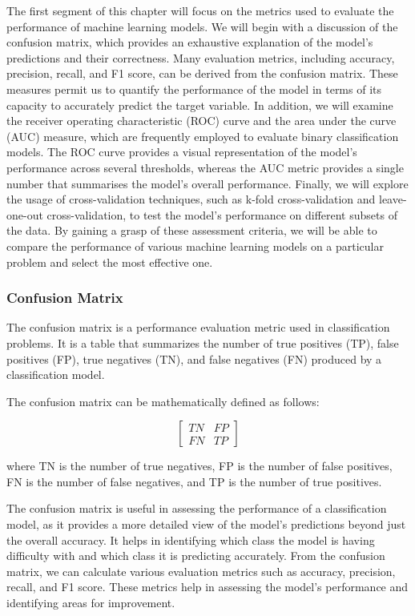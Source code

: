 \documentclass{article}[12pt]
\theoremstyle{definition}
\begin{document}
The first segment of this chapter will focus on the metrics used to evaluate the performance of machine learning models. We will begin with a discussion of the confusion matrix, which provides an exhaustive explanation of the model's predictions and their correctness. Many evaluation metrics, including accuracy, precision, recall, and F1 score, can be derived from the confusion matrix. These measures permit us to quantify the performance of the model in terms of its capacity to accurately predict the target variable. In addition, we will examine the receiver operating characteristic (ROC) curve and the area under the curve (AUC) measure, which are frequently employed to evaluate binary classification models. The ROC curve provides a visual representation of the model's performance across several thresholds, whereas the AUC metric provides a single number that summarises the model's overall performance. Finally, we will explore the usage of cross-validation techniques, such as k-fold cross-validation and leave-one-out cross-validation, to test the model's performance on different subsets of the data. By gaining a grasp of these assessment criteria, we will be able to compare the performance of various machine learning models on a particular problem and select the most effective one.

\bigskip

\subsubsection{Confusion Matrix}

\bigskip

The confusion matrix is a performance evaluation metric used in classification problems. It is a table that summarizes the number of true positives (TP), false positives (FP), true negatives (TN), and false negatives (FN) produced by a classification model.

The confusion matrix can be mathematically defined as follows:

$$\begin{bmatrix} TN & FP \\ FN & TP \end{bmatrix}$$

\noindent
where TN is the number of true negatives, FP is the number of false positives, FN is the number of false negatives, and TP is the number of true positives.

\newpage

\noindent
The confusion matrix is useful in assessing the performance of a classification model, as it provides a more detailed view of the model's predictions beyond just the overall accuracy. It helps in identifying which class the model is having difficulty with and which class it is predicting accurately. From the confusion matrix, we can calculate various evaluation metrics such as accuracy, precision, recall, and F1 score. These metrics help in assessing the model's performance and identifying areas for improvement.
\end{document}
